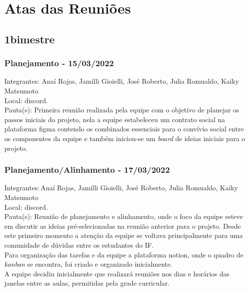 \chapter{Atas das Reuniões}
\label{atasReunioes}

\section{1\textordmasculine bimestre}
\subsection{Planejamento - 15/03/2022}
\noindent Integrantes: Anaí Rojas, Jamilli Gioielli, José Roberto, Julia Romualdo, Kaiky Matsumoto \\
Local: \gls{discord}. \\
Pauta(s): Primeira reunião realizada pela equipe com o objetivo de planejar os passos iniciais do projeto, nela a equipe estabeleceu um contrato social na plataforma \gls{figma} contendo os combinados essenciais para o convívio social entre os componentes da equipe e também iniciou-se um \textsl{board} de ideias iniciais para o projeto.

\subsection{Planejamento/Alinhamento - 17/03/2022}
\noindent Integrantes:\,Anaí Rojas, Jamilli Gioielli, José Roberto, Julia Romualdo, Kaiky Matsumoto \\
Local: \gls{discord}.\\
Pauta(s): Reunião de planejamento e alinhamento, onde o foco da equipe esteve em discutir as ideias pré-selecionadas na reunião anterior para o projeto. Desde este primeiro momento a atenção da equipe se voltava principalmente para uma comunidade de dúvidas entre os estudantes do IF. \\
Para organização das tarefas e da equipe a plataforma \gls{notion}, onde o quadro de \textsl{kanban} se encontra, foi criado e organizado inicialmente. \\
A equipe decidiu inicialmente que realizará reuniões nos dias e horários das janelas entre as aulas, permitidas pela grade curricular.

